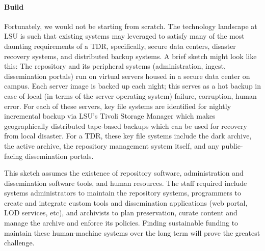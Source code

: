 \paragraph{Build}
Fortunately, we would not be starting from scratch. The technology landscape at LSU is such that existing systems may leveraged to satisfy many of the most daunting requirements of a TDR, specifically, secure data centers, disaster recovery systems, and distributed backup systems. A brief sketch might look like this: The repository and its peripheral systems (administration, ingest, dissemination portals) run on virtual servers housed in a secure data center on campus. Each server image is backed up each night; this serves as a hot backup in case of local (in terms of the server operating system) failure, corruption, human error. For each of these servers, key file systems are identified for nightly incremental backup via LSU's Tivoli Storage Manager which makes geographically distributed tape-based backups which can be used for recovery from local disaster. For a TDR, these key file systems include the dark archive, the active archive, the repository management system itself, and any public-facing dissemination portals.

This sketch assumes the existence of repository software, administration and dissemination software tools, and human resources. The staff required include systems administrators to maintain the repository systems, programmers to create and integrate custom tools and dissemination applications (web portal, LOD services, etc), and archivists to plan preservation, curate content and manage the archive and enforce its policies.  Finding sustainable funding to maintain these human-machine systems over the long term will prove the greatest challenge. 

